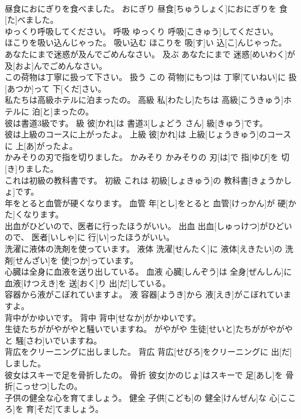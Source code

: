 \documentclass[8pt]{extreport}
\begin{document}
\begin{CJK}{UTF8}{min}
\\	昼食におにぎりを食べました。	おにぎり	昼食[ちゅうしょく]におにぎりを 食[た]べました。	
\\	ゆっくり呼吸してください。	呼吸	ゆっくり 呼吸[こきゅう]してください。	
\\	ほこりを吸い込んじゃった。	吸い込む	ほこりを 吸[す]い 込[こ]んじゃった。	
\\	あなたにまで迷惑が及んでごめんなさい。	及ぶ	あなたにまで 迷惑[めいわく]が 及[およ]んでごめんなさい。	
\\	この荷物は丁寧に扱って下さい。	扱う	この 荷物[にもつ]は 丁寧[ていねい]に 扱[あつか]って 下[くだ]さい。	
\\	私たちは高級ホテルに泊まったの。	高級	私[わたし]たちは 高級[こうきゅう]ホテルに 泊[と]まったの。	
\\	彼は書道3級です。	級	彼[かれ]は 書道3[しょどう さん] 級[きゅう]です。	
\\	彼は上級のコースに上がったよ。	上級	彼[かれ]は 上級[じょうきゅう]のコースに 上[あ]がったよ。	
\\	かみそりの刃で指を切りました。	かみそり	かみそりの 刃[は]で 指[ゆび]を 切[き]りました。	
\\	これは初級の教科書です。	初級	これは 初級[しょきゅう]の 教科書[きょうかしょ]です。	
\\	年をとると血管が硬くなります。	血管	年[とし]をとると 血管[けっかん]が 硬[かた]くなります。	
\\	出血がひどいので、医者に行ったほうがいい。	出血	出血[しゅっけつ]がひどいので、 医者[いしゃ]に 行[い]ったほうがいい。	
\\	洗濯に液体の洗剤を使っています。	液体	洗濯[せんたく]に 液体[えきたい]の 洗剤[せんざい]を 使[つか]っています。	
\\	心臓は全身に血液を送り出している。	血液	心臓[しんぞう]は 全身[ぜんしん]に 血液[けつえき]を 送[おく]り 出[だ]している。	
\\	容器から液がこぼれていますよ。	液	容器[ようき]から 液[えき]がこぼれていますよ。	
\\	背中がかゆいです。	背中	背中[せなか]がかゆいです。	
\\	生徒たちががやがやと騒いでいますね。	がやがや	生徒[せいと]たちががやがやと 騒[さわ]いでいますね。	
\\	背広をクリーニングに出しました。	背広	背広[せびろ]をクリーニングに 出[だ]しました。	
\\	彼女はスキーで足を骨折したの。	骨折	彼女[かのじょ]はスキーで 足[あし]を 骨折[こっせつ]したの。	
\\	子供の健全な心を育てましょう。	健全	子供[こども]の 健全[けんぜん]な 心[こころ]を 育[そだ]てましょう。	

\end{CJK}
\end{document}
